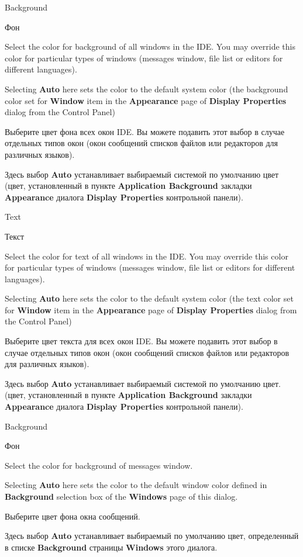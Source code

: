 
\begin{popup}
\ifenglish
\caption{Background}
\else
\caption{Фон}
\fi
{}

\ifenglish
Select the color for background of all windows in the IDE.
You may override this color for particular types of windows (messages window,
file list or editors for different languages).

Selecting {\bf Auto} here sets the color to the default system color
(the background color set for {\bf Window} item in the {\bf Appearance} page of
{\bf Display Properties} dialog from the Control Panel)

\else
Выберите цвет фона всех окон IDE.
Вы можете подавить этот выбор в случае отдельных типов окон
(окон сообщений списков файлов или редакторов для различных языков).

Здесь выбор {\bf Auto} устанавливает выбираемый системой по умолчанию цвет
(цвет, установленный в пункте {\bf Application Background} закладки
{\bf Appearance} диалога {\bf Display Properties} контрольной панели).
\fi
\end{popup}

\begin{popup}
\ifenglish
\caption{Text}
\else
\caption{Текст}
\fi
{}

\ifenglish
Select the color for text of all windows in the IDE.
You may override this color for particular types of windows (messages window,
file list or editors for different languages).

Selecting {\bf Auto} here sets the color to the default system color
(the text color set for {\bf Window} item in the {\bf Appearance} page of
{\bf Display Properties} dialog from the Control Panel)

\else
Выберите цвет текста для всех окон IDE.
Вы можете подавить этот выбор в случае отдельных типов окон
(окон сообщений списков файлов или редакторов для различных языков).

Здесь выбор {\bf Auto} устанавливает выбираемый системой по умолчанию цвет.
(цвет, установленный в пункте {\bf Application Background} закладки
{\bf Appearance} диалога {\bf Display Properties} контрольной панели).
\fi
\end{popup}

\begin{popup}
\ifenglish
\caption{Background}
\else
\caption{Фон}
\fi
{}

\ifenglish
Select the color for background of messages window.

Selecting {\bf Auto} here sets the color to the default window color
defined in {\bf Background} selection box of the {\bf Windows} page of this
dialog.

\else
Выберите цвет фона окна сообщений.

Здесь выбор {\bf Auto} устанавливает выбираемый по умолчанию цвет,
определенный в списке {\bf Background} страницы {\bf Windows} этого диалога.
\fi
\end{popup}

